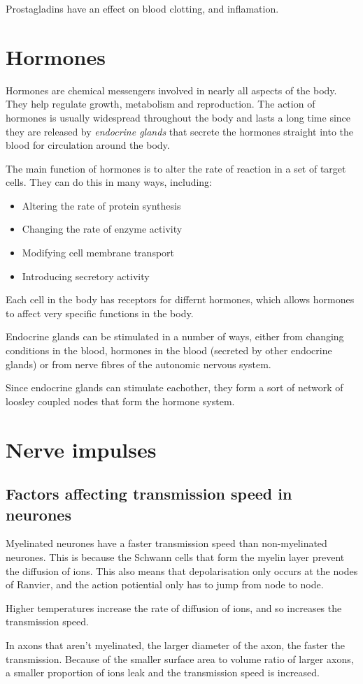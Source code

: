 \documentclass{article}
\begin{document}
Prostagladins have an effect on blood clotting, and inflamation.

\section*{Hormones}

Hormones are chemical messengers involved in nearly all aspects of the body.
They help regulate growth, metabolism and reproduction. The action of hormones
is usually widespread throughout the body and lasts a long time since they are
released by {\it endocrine glands} that secrete the hormones straight into the
blood for circulation around the body.

The main function of hormones is to alter the rate of reaction in a set of
target cells. They can do this in many ways, including:

\begin{itemize}

	\item Altering the rate of protein synthesis
	\item Changing the rate of enzyme activity
	\item Modifying cell membrane transport
	\item Introducing secretory activity

\end{itemize}

Each cell in the body has receptors for differnt hormones, which allows hormones
to affect very specific functions in the body.

Endocrine glands can be stimulated in a number of ways, either from changing
conditions in the blood, hormones in the blood (secreted by other endocrine
glands) or from nerve fibres of the autonomic nervous system.

Since endocrine glands can stimulate eachother, they form a sort of network of
loosley coupled nodes that form the hormone system.

\section*{Nerve impulses}


\subsection*{Factors affecting transmission speed in neurones}

Myelinated neurones have a faster transmission speed than non-myelinated
neurones. This is because the Schwann cells that form the myelin layer prevent
the diffusion of ions. This also means that depolarisation only occurs at the
nodes of Ranvier, and the action potiential only has to jump from node to node.

Higher temperatures increase the rate of diffusion of ions, and so increases the
transmission speed.

In axons that aren't myelinated, the larger diameter of the axon, the faster the
transmission. Because of the smaller surface area to volume ratio of larger
axons, a smaller proportion of ions leak and the transmission speed is
increased.
\end{document}
